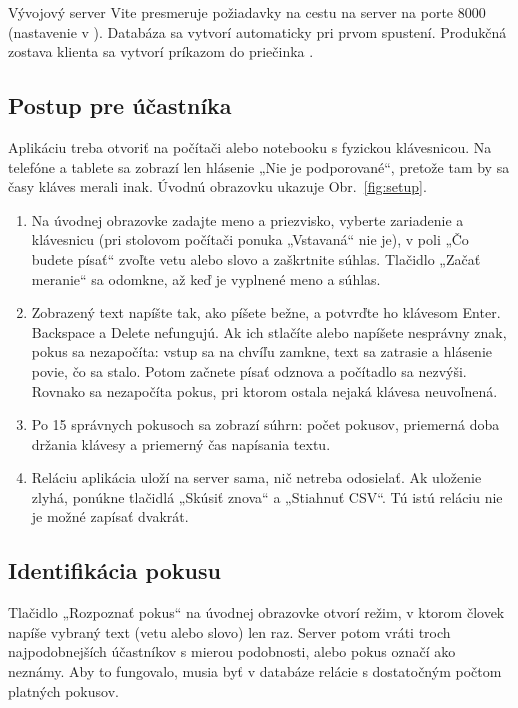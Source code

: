 Vývojový server Vite presmeruje požiadavky na cestu  na server
na porte 8000 (nastavenie v ). Databáza
 sa vytvorí automaticky pri prvom spustení.
Produkčná zostava klienta sa vytvorí príkazom 
do priečinka .

\subsection{Postup pre účastníka}

Aplikáciu treba otvoriť na počítači alebo notebooku s fyzickou klávesnicou.
Na telefóne a tablete sa zobrazí len hlásenie „Nie je podporované“, pretože
tam by sa časy kláves merali inak. Úvodnú obrazovku ukazuje
Obr.~\ref{fig:setup}.

\begin{enumerate}
  \item Na úvodnej obrazovke zadajte meno a priezvisko, vyberte zariadenie
        a klávesnicu (pri stolovom počítači ponuka „Vstavaná“ nie je),
        v poli „Čo budete písať“ zvoľte vetu alebo slovo a zaškrtnite súhlas.
        Tlačidlo „Začať meranie“ sa odomkne, až keď je vyplnené meno a súhlas.
  \item Zobrazený text napíšte tak, ako píšete bežne, a potvrďte ho
        klávesom Enter. Backspace a Delete nefungujú. Ak ich stlačíte alebo
        napíšete nesprávny znak, pokus sa nezapočíta: vstup sa na chvíľu
        zamkne, text sa zatrasie a hlásenie povie, čo sa stalo. Potom začnete
        písať odznova a počítadlo sa nezvýši. Rovnako sa nezapočíta pokus,
        pri ktorom ostala nejaká klávesa neuvoľnená.
  \item Po 15 správnych pokusoch sa zobrazí súhrn: počet pokusov, priemerná
        doba držania klávesy a priemerný čas napísania textu.
  \item Reláciu aplikácia uloží na server sama, nič netreba odosielať. Ak
        uloženie zlyhá, ponúkne tlačidlá „Skúsiť znova“ a „Stiahnuť CSV“.
        Tú istú reláciu nie je možné zapísať dvakrát.
\end{enumerate}

\subsection{Identifikácia pokusu}

Tlačidlo „Rozpoznať pokus“ na úvodnej obrazovke otvorí režim, v ktorom
človek napíše vybraný text (vetu alebo slovo) len raz. Server potom vráti
troch najpodobnejších účastníkov s mierou podobnosti, alebo pokus označí ako
neznámy. Aby to fungovalo, musia byť v databáze relácie s dostatočným počtom
platných pokusov.

